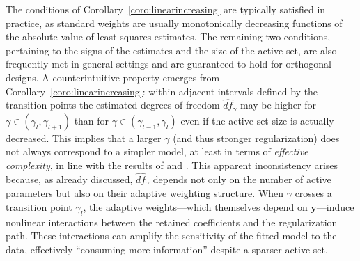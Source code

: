 \documentclass[a4paper, 12pt]{article}
\def\by{\boldsymbol{y}}
\def\by{\mathbf{y}}
\begin{document}
%
\noindent The conditions of Corollary~\ref{coro:linearincreasing} are typically satisfied in practice, as standard weights are usually monotonically decreasing functions of the absolute value of least squares estimates. The remaining two conditions, pertaining to the signs of the estimates and the size of the active set, are also frequently met in general settings and are guaranteed to hold for orthogonal designs.
%
A counterintuitive property emerges from Corollary~\ref{coro:linearincreasing}: within adjacent intervals defined by the transition points the estimated degrees of freedom $\widehat{df}_\gamma$ may be higher for $\gamma \in (\gamma_l, \gamma_{l+1})$ than for $\gamma \in (\gamma_{l-1}, \gamma_l)$ even if the active set size is actually decreased. This implies that a larger $\gamma$ (and thus stronger regularization) does not always correspond to a simpler model, at least in terms of \emph{effective complexity}, in line with the results of \cite{kaufman_rosset.2014} and \cite{janson_etal.2015}. This apparent inconsistency arises because, as already discussed, $\widehat{df}_\gamma$ depends not only on the number of active parameters but also on their adaptive weighting structure. When $\gamma$ crosses a transition point $\gamma_l$, the adaptive weights---which themselves depend on $\by$---induce nonlinear interactions between the retained coefficients and the regularization path. These interactions can amplify the sensitivity of the fitted model to the data, effectively ``consuming more information'' despite a sparser active set.  
%
\end{document}
